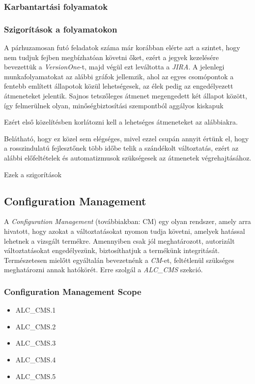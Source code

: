 \subsubsection{Karbantartási folyamatok}

\subsubsection{Szigorítások a folyamatokon}

A párhuzamosan futó feladatok száma már korábban elérte azt a szintet, hogy nem tudjuk fejben
megbízhatóan követni őket, ezért a jegyek kezelésére bevezettük a \emph{VersionOne}-t, majd végül
ezt leváltotta a \emph{JIRA}.
A jelenlegi munkafolyamatokat az alábbi gráfok jellemzik, ahol az egyes csomópontok a fentebb
említett állapotok közül lehetségesek, az élek pedig az engedélyezett átmeneteket jelentik.
Sajnos tetszőleges átmenet megengedett két állapot között, így felmerülnek olyan, minőségbiztosítási
szempontból aggályos kiskapuk

Ezért első közelítésben korlátozni kell a lehetséges átmeneteket az alábbiakra.


Belátható, hogy ez közel sem elégséges, mivel ezzel csupán annyit értünk el, hogy a rosszindulatú
fejlesztőnek több időbe telik a szándékolt változtatás, ezért az alábbi előfeltételek és automatizmusok
szükségesek az átmenetek végrehajtásához.


Ezek a szigorítások 

\subsection{Configuration Management}
A \emph{Configuration Management} (továbbiakban: CM) egy olyan rendszer, amely arra hivatott,
hogy azokat a változtatásokat nyomon tudja követni, amelyek hatással lehetnek a vizsgált termékre.
Amennyiben csak jól meghatározott, autorizált változtatásokat engedélyezünk, biztosíthatjuk a
termékünk integritását.
Természetesen mielőtt egyáltalán bevezetnénk a \emph{CM}-et, feltétlenül szükséges meghatározni
annak hatókörét. Erre szolgál a \emph{ALC\_CMS} szekció.

\subsubsection{Configuration Management Scope}
\begin{itemize}
    \item{ALC\_CMS.1}
    \item{ALC\_CMS.2}
    \item{ALC\_CMS.3}
    \item{ALC\_CMS.4}
    \item{ALC\_CMS.5}
\end{itemize}

